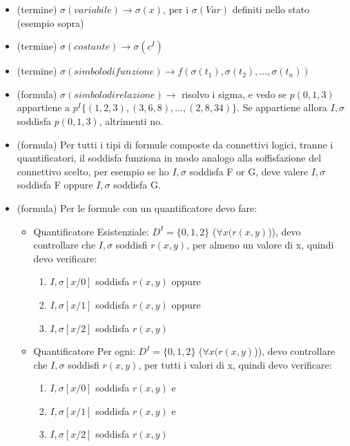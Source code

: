 \documentclass[11pt]{article}
\begin{document}
\begin{itemize}
    \item (termine) $\sigma(variabile) \to \sigma(x)$, per i $\sigma(Var)$ definiti nello stato (esempio sopra)
    \item (termine) $\sigma(costante) \to \sigma(c^{I})$
    \item (termine) $\sigma(simbolo di funzione) \to f(\sigma(t_1),\sigma(t_2), ... ,\sigma(t_n))$
    \item (formula) $\sigma(simbolo di relazione) \to$ risolvo i sigma, e vedo se $p(0,1,3)$ appartiene a $p^{I}\{(1,2,3),(3,6,8), ... ,(2,8,34)\}$. Se 
    appartiene allora $I, \sigma $ soddisfa $p(0,1,3)$, altrimenti no.
    \item (formula) Per tutti i tipi di formule composte da connettivi logici, tranne i quantificatori, il soddisfa funziona in modo analogo alla soffisfazione del connettivo scelto, 
    per esempio se ho $I, \sigma $ soddisfa F or G, deve valere $I, \sigma $ soddisfa F oppure $I, \sigma $ soddisfa G.
    \item (formula) Per le formule con un quantificatore devo fare:
    \begin{itemize}
        \item Quantificatore Esistenziale: $D^{I} = \{0,1,2\}$ ($\forall x (r(x,y)$)), devo controllare che $I, \sigma$ soddisfi 
        $r(x,y)$, per almeno un valore di x, quindi devo verificare:
        \begin{enumerate}
            \item $I, \sigma[x/0]$ soddisfa $r(x,y)$ oppure
            \item $I, \sigma[x/1]$ soddisfa $r(x,y)$ oppure
            \item $I, \sigma[x/2]$ soddisfa $r(x,y)$
        \end{enumerate}
        \item Quantificatore Per ogni: $D^{I} = \{0,1,2\}$ ($\forall x (r(x,y)$)), devo controllare che $I, \sigma$ soddisfi 
        $r(x,y)$, per tutti i valori di x, quindi devo verificare:
        \begin{enumerate}
            \item $I, \sigma[x/0]$ soddisfa $r(x,y)$ e
            \item $I, \sigma[x/1]$ soddisfa $r(x,y)$ e
            \item $I, \sigma[x/2]$ soddisfa $r(x,y)$
        \end{enumerate}
    \end{itemize}
\end{itemize}
\end{document}
